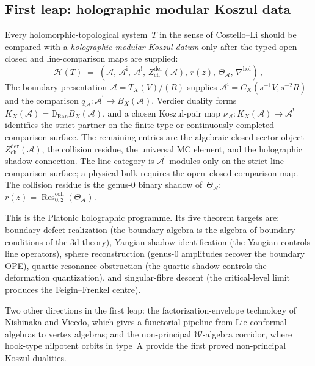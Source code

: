 \documentclass[11pt,reqno]{amsart}
\theoremstyle{definition}
\theoremstyle{remark}
\providecommand{\cA}{\mathcal{A}}
\providecommand{\cH}{\mathcal{H}}
\providecommand{\cW}{\mathcal{W}}
\providecommand{\Ran}{\mathrm{Ran}}
\providecommand{\Res}{\operatorname{Res}}
\numberwithin{equation}{section}
\begin{document}
\subsection{First leap: holographic modular Koszul data}
\label{ssec:holographic}

Every holomorphic-topological system~$T$ in the sense of
Costello--Li should be compared with a \emph{holographic
modular Koszul datum} only after the typed open--closed and
line-comparison maps are supplied:
\begin{equation}\label{eq:holographic-datum}
\cH(T)
\;=\;
(\cA,\, \cA^{\mathrm i},\, \cA^!,\,
Z^{\mathrm{der}}_{\mathrm{ch}}(\cA),\, r(z),\,
\Theta_\cA,\, \nabla^{\mathrm{hol}})\,,
\end{equation}
The boundary presentation \(\cA=T_X(V)/(R)\) supplies
\(\cA^{\mathrm i}=C_X(s^{-1}V,s^{-2}R)\) and the comparison
\(q_\cA\colon\cA^{\mathrm i}\to B_X(\cA)\).  Verdier duality forms
\(K_X(\cA)=\mathbb D_{\Ran}B_X(\cA)\), and a chosen Koszul-pair map
\(\nu_\cA\colon K_X(\cA)\to\cA^!\) identifies the strict partner on
the finite-type or continuously completed comparison surface.  The
remaining entries are the algebraic closed-sector object
\(Z^{\mathrm{der}}_{\mathrm{ch}}(\cA)\), the collision residue, the
universal MC element, and the holographic shadow connection. The
line category is \(\cA^!\)-modules only on the strict line-comparison
surface; a physical bulk requires the open--closed comparison map.
The collision residue is the genus-$0$
binary shadow of~$\Theta_\cA$:
$r(z) = \Res^{\mathrm{coll}}_{0,2}(\Theta_\cA)$.

This is the Platonic holographic programme. Its five
theorem targets are: boundary-defect realization (the
boundary algebra is the algebra of boundary conditions
of the $3$d theory), Yangian-shadow identification (the
Yangian controls line operators), sphere reconstruction
(genus-$0$ amplitudes recover the boundary OPE), quartic
resonance obstruction (the quartic shadow controls the
deformation quantization), and singular-fibre descent (the
critical-level limit produces the Feigin--Frenkel centre).

Two other directions in the first leap: the
factorization-envelope technology of Nishinaka and Vicedo,
which gives a functorial pipeline from Lie conformal
algebras to vertex algebras; and the non-principal
$\cW$-algebra corridor, where hook-type nilpotent orbits
in type~A provide the first proved non-principal Koszul
dualities.
\end{document}
